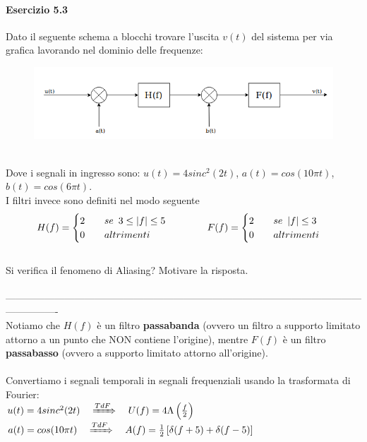 \documentclass[12pt,a4paper]{article}
\begin{document}
	\paragraph{Esercizio 5.3} Dato il seguente schema a blocchi trovare l’uscita $v(t)$ del sistema per via grafica lavorando nel dominio delle frequenze:
	\begin{figure}[h!]
		\centering
		\includegraphics[scale=0.5]{./images/fourier31.png}
	\end{figure}
	\\Dove i segnali in ingresso sono: $u(t) = 4sinc^2(2t)$, $a(t) = cos(10\pi t)$, $b(t) = cos(6\pi t)$.\\I filtri invece sono definiti nel modo seguente
	\[
		H(f) = 
		\begin{cases}
		2\quad\quad se\hspace{5px}3 \leq |f| \leq 5\\
		0\quad\quad altrimenti
		\end{cases}
		\quad\quad\quad
		F(f) = 
		\begin{cases}
		2\quad\quad se \hspace{5px}|f| \leq 3\\
		0\quad\quad altrimenti
		\end{cases}
	\]
	\\Si verifica il fenomeno di Aliasing? Motivare la risposta.
	\\\\
	----------------------------------------------------------------------------------------------------------------------------\\
	Notiamo che $H(f)$ è un filtro \textbf{passabanda} (ovvero un filtro a supporto limitato attorno a un punto che NON contiene l'origine), mentre $F(f)$ è un filtro \textbf{passabasso} (ovvero a supporto limitato attorno all'origine).\\ \\
	Convertiamo i segnali temporali in segnali frequenziali usando la trasformata di Fourier:\\
	$u(t) = 4sinc^2(2t)\quad\xRightarrow[]{TdF}\quad U(f) = 4\Lambda\left(\frac{f}{2}\right)$\\
	$a(t) = cos(10\pi t)\quad\xRightarrow[]{TdF}\quad A(f) = \frac{1}{2}\left[\delta(f+5) + \delta(f-5)\right]$\\
\end{document}
